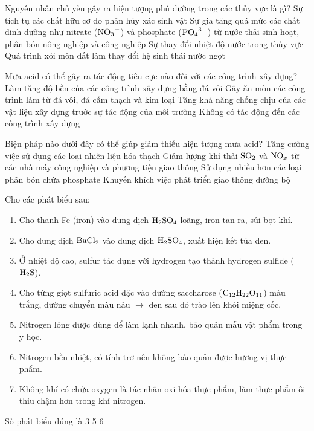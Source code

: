 \documentclass[12pt,a4paper]{article}
\begin{document}
\begin{ex}
Nguyên nhân chủ yếu gây ra hiện tượng phú dưỡng trong các thủy vực là gì?
\choice
{Sự tích tụ các chất hữu cơ do phân hủy xác sinh vật}
{\True Sự gia tăng quá mức các chất dinh dưỡng như nitrate ($\ce{NO3-}$) và phosphate ($\ce{PO4^3-}$) từ nước thải sinh hoạt, phân bón nông nghiệp và công nghiệp}
{Sự thay đổi nhiệt độ nước trong thủy vực}
{Quá trình xói mòn đất làm thay đổi hệ sinh thái nước ngọt}

\end{ex}

\begin{ex}
Mưa acid có thể gây ra tác động tiêu cực nào đối với các công trình xây dựng?
\choice
{Làm tăng độ bền của các công trình xây dựng bằng đá vôi}
{\True Gây ăn mòn các công trình làm từ đá vôi, đá cẩm thạch và kim loại}
{Tăng khả năng chống chịu của các vật liệu xây dựng trước sự tác động của môi trường}
{Không có tác động đến các công trình xây dựng}

\end{ex}

\begin{ex}
Biện pháp nào dưới đây có thể giúp giảm thiểu hiện tượng mưa acid?
\choice
{Tăng cường việc sử dụng các loại nhiên liệu hóa thạch}
{\True Giảm lượng khí thải $\ce{SO2}$ và $\ce{NO_x}$ từ các nhà máy công nghiệp và phương tiện giao thông}
{Sử dụng nhiều hơn các loại phân bón chứa phosphate}
{Khuyến khích việc phát triển giao thông đường bộ}

\end{ex}

\begin{ex}
Cho các phát biểu sau:
\begin{enumerate}[(1)]
	\item Cho thanh Fe (iron) vào dung dịch $\ce{H2SO4}$ loãng, iron tan ra, sủi bọt khí.
	\item Cho dung dịch $\ce{BaCl2}$ vào dung dịch $\ce{H2SO4}$, xuất hiện kết tủa đen.
	\item Ở nhiệt độ cao, sulfur tác dụng với hydrogen tạo thành hydrogen sulfide ($\ce{H2S}$).
	\item Cho từng giọt sulfuric acid đặc vào đường saccharose ($\ce{C12H22O11}$) màu trắng, đường chuyển màu nâu $\rightarrow$ đen sau đó trào lên khỏi miệng cốc.
	\item Nitrogen lỏng được dùng để làm lạnh nhanh, bảo quản mẫu vật phẩm trong y học.
	\item Nitrogen bền nhiệt, có tính trơ nên không bảo quản được hương vị thực phẩm.
	\item Không khí có chứa oxygen là tác nhân oxi hóa thực phẩm, làm thực phẩm ôi thiu chậm hơn trong khí nitrogen.
\end{enumerate}
Số phát biểu đúng là
\choice
{3}
{}
{5}
{6}

\end{ex}
\end{document}
